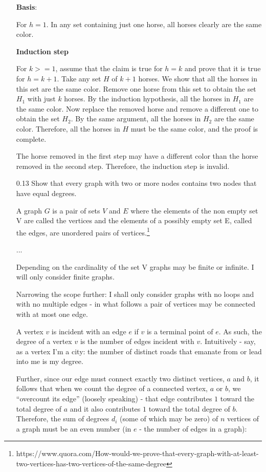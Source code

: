 \begin{enumerate}
\textbf{Basis}: 

For $h = 1$. In any set containing just one horse, all horses clearly are the same color.

\textbf{Induction step}

For $k >= 1$, assume that the claim is true for $h = k$ and prove that it is true for $h = k+1$. Take any set $H$ of $k+1$ horses. We show that all the horses in this set are the same color. Remove one horse from this set to obtain the set $H_1$ with just $k$ horses. By the induction hypothesis, all the horses in $H_1$ are the same color. Now replace the removed horse and remove a different one to obtain the set $H_2$. By the same argument, all the horses in $H_2$ are the same color. Therefore, all the horses in $H$ must be the same color, and the proof is complete.

The horse removed in the first step may have a different color than the horse removed in the second step. Therefore, the induction step is invalid.

\item[0.13]
Show that every graph with two or more nodes contains two nodes that have equal degrees.

A graph $G$ is a pair of sets $V$ and $E$ where the elements of the non empty set V are called the vertices and the elements of a possibly empty set E, called the edges, are unordered pairs of vertices.\footnote{https://www.quora.com/How-would-we-prove-that-every-graph-with-at-least-two-vertices-has-two-vertices-of-the-same-degree}

...

Depending on the cardinality of the set V graphs may be finite or infinite. I will only consider finite graphs.

Narrowing the scope further: I shall only consider graphs with no loops and with no multiple edges - in what follows a pair of vertices may be connected with at most one edge.

A vertex $v$ is incident with an edge $e$ if $v$ is a terminal point of $e$. As such, the degree of a vertex $v$ is the number of edges incident with $v$. Intuitively - say, as a vertex I’m a city: the number of distinct roads that emanate from or lead into me is my degree.

Further, since our edge must connect exactly two distinct vertices, $a$ and $b$, it follows that when we count the degree of a connected vertex, $a$ or $b$, we “overcount its edge” (loosely speaking) - that edge contributes $1$ toward the total degree of $a$ and it also contributes $1$ toward the total degree of $b$.
Therefore, the sum of degrees $d_{i}$ (some of which may be zero) of $n$ vertices of a graph must be an even number (in $e$ - the number of edges in a graph):


\end{enumerate}

